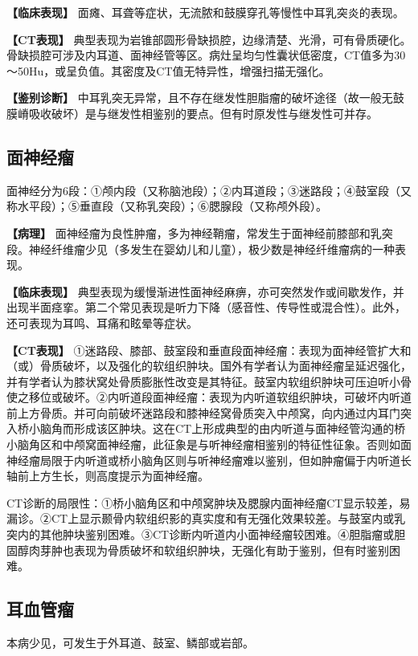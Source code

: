 \textbf{【临床表现】}
面瘫、耳聋等症状，无流脓和鼓膜穿孔等慢性中耳乳突炎的表现。

\textbf{【CT表现】}
典型表现为岩锥部圆形骨缺损腔，边缘清楚、光滑，可有骨质硬化。骨缺损腔可涉及内耳道、面神经管等区。病灶呈均匀性囊状低密度，CT值多为30～50Hu，或呈负值。其密度及CT值无特异性，增强扫描无强化。

\textbf{【鉴别诊断】}
中耳乳突无异常，且不存在继发性胆脂瘤的破坏途径（故一般无鼓膜嵴吸收破坏）是与继发性相鉴别的要点。但有时原发性与继发性可并存。

\subsection{面神经瘤}

面神经分为6段：①颅内段（又称脑池段）；②内耳道段；③迷路段；④鼓室段（又称水平段）；⑤垂直段（又称乳突段）；⑥腮腺段（又称颅外段）。

\textbf{【病理】}
面神经瘤为良性肿瘤，多为神经鞘瘤，常发生于面神经前膝部和乳突段。神经纤维瘤少见（多发生在婴幼儿和儿童），极少数是神经纤维瘤病的一种表现。

\textbf{【临床表现】}
典型表现为缓慢渐进性面神经麻痹，亦可突然发作或间歇发作，并出现半面痉挛。第二个常见表现是听力下降（感音性、传导性或混合性）。此外，还可表现为耳鸣、耳痛和眩晕等症状。

\textbf{【CT表现】}
①迷路段、膝部、鼓室段和垂直段面神经瘤：表现为面神经管扩大和（或）骨质破坏，以及强化的软组织肿块。国外有学者认为面神经瘤呈延迟强化，并有学者认为膝状窝处骨质膨胀性改变是其特征。鼓室内软组织肿块可压迫听小骨使之移位或破坏。②内听道段面神经瘤：表现为内听道软组织肿块，可破坏内听道前上方骨质。并可向前破坏迷路段和膝神经窝骨质突入中颅窝，向内通过内耳门突入桥小脑角而形成该区肿块。这在CT上形成典型的由内听道与面神经管沟通的桥小脑角区和中颅窝面神经瘤，此征象是与听神经瘤相鉴别的特征性征象。否则如面神经瘤局限于内听道或桥小脑角区则与听神经瘤难以鉴别，但如肿瘤偏于内听道长轴前上方生长，则高度提示为面神经瘤。

CT诊断的局限性：①桥小脑角区和中颅窝肿块及腮腺内面神经瘤CT显示较差，易漏诊。②CT上显示颞骨内软组织影的真实度和有无强化效果较差。与鼓室内或乳突内的其他肿块鉴别困难。③CT诊断内听道内小面神经瘤较困难。④胆脂瘤或胆固醇肉芽肿也表现为骨质破坏和软组织肿块，无强化有助于鉴别，但有时鉴别困难。

\subsection{耳血管瘤}

本病少见，可发生于外耳道、鼓室、鳞部或岩部。

